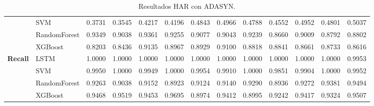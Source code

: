 \begin{table}[h]
\begin{adjustbox}{max width=15cm}
\begin{tabular}{|c|l|r|r|r|r|r|r|r|r|r|r|r|}
			& SVM &  0.3731 &  0.3545 &  0.4217 &  0.4196 &  0.4843 &  0.4966 &  0.4788 &  0.4552 &  0.4952 &  0.4801 &  0.5037 \\
			& RandomForest &  0.9349 &  0.9038 &  0.9361 &  0.9255 &  0.9077 &  0.9043 &  0.9239 &  0.8660 &  0.9009 &  0.8792 &  0.8802 \\
			& XGBoost &  0.8203 &  0.8436 &  0.9135 &  0.8967 &  0.8929 &  0.9100 &  0.8818 &  0.8841 &  0.8661 &  0.8733 &  0.8616 \\
			\hline
			\textbf{Recall} & LSTM &  1.0000 &  1.0000 &  1.0000 &  1.0000 &  1.0000 &  1.0000 &  1.0000 &  1.0000 &  1.0000 &  1.0000 &  0.9953 \\
			& SVM &  0.9950 &  1.0000 &  0.9949 &  1.0000 &  0.9954 &  0.9910 &  1.0000 &  0.9851 &  0.9904 &  1.0000 &  0.9952 \\
			& RandomForest &  0.9263 &  0.9038 &  0.9152 &  0.8923 &  0.9124 &  0.9140 &  0.9290 &  0.8936 &  0.9272 &  0.9381 &  0.9494 \\
			& XGBoost &  0.9468 &  0.9519 &  0.9453 &  0.9695 &  0.8974 &  0.9412 &  0.8995 &  0.9242 &  0.9417 &  0.9324 &  0.9507 \\
			\hline
		\end{tabular}
	\end{adjustbox}
	\caption{Resultados HAR con ADASYN.}
	\label{tab:HAR_ADASYN}
\end{table}
\newpage
